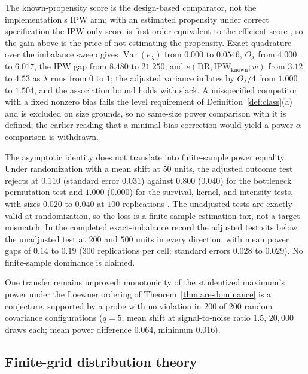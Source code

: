 The known-propensity score is the design-based comparator, not the implementation's IPW arm: with an estimated propensity under correct specification the IPW-only score is first-order equivalent to the efficient score \cite{hirano_imbens_ridder_2003}, so the gain above is the price of not estimating the propensity. Exact quadrature over the imbalance sweep gives $\operatorname{Var}(e_\lambda)$ from $0.000$ to $0.0546$, $O_\lambda$ from $4.000$ to $6.017$, the IPW gap from $8.480$ to $21.250$, and $e(\mathrm{DR},\mathrm{IPW}_{\mathrm{known}};w)$ from $3.12$ to $4.53$ as $\lambda$ runs from $0$ to $1$; the adjusted variance inflates by $O_\lambda/4$ from $1.000$ to $1.504$, and the association bound holds with slack. A misspecified competitor with a fixed nonzero bias fails the level requirement of Definition~\ref{def:class}(a) and is excluded on size grounds, so no same-size power comparison with it is defined; the earlier reading that a minimal bias correction would yield a power-$\alpha$ comparison is withdrawn.

The asymptotic identity does not translate into finite-sample power equality. Under randomization with a mean shift at $50$ units, the adjusted outcome test rejects at $0.110$ (standard error $0.031$) against $0.800$ ($0.040$) for the bottleneck permutation test and $1.000$ ($0.000$) for the survival, kernel, and intensity tests, with sizes $0.020$ to $0.040$ at $100$ replications \cite{robinson_turner_2017,murris_strand_2026,kwitt_neurips_2015,gretton_2012,han_kim_kim_2026}. The unadjusted tests are exactly valid at randomization, so the loss is a finite-sample estimation tax, not a target mismatch. In the completed exact-imbalance record the adjusted test sits below the unadjusted test at $200$ and $500$ units in every direction, with mean power gaps of $0.14$ to $0.19$ ($300$ replications per cell; standard errors $0.028$ to $0.029$). No finite-sample dominance is claimed.

One transfer remains unproved: monotonicity of the studentized maximum's power under the Loewner ordering of Theorem~\ref{thm:are-dominance} is a conjecture, supported by a probe with no violation in $200$ of $200$ random covariance configurations ($q=5$, mean shift at signal-to-noise ratio $1.5$, $20{,}000$ draws each; mean power difference $0.064$, minimum $0.016$).
\subsection{Finite-grid distribution theory}
\label{subsec:distgrid}

